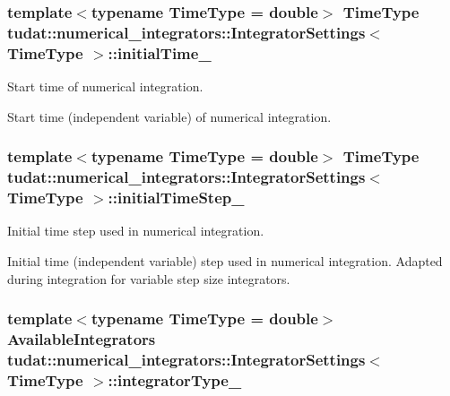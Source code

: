 \subsubsection[{\texorpdfstring{initial\+Time\+\_\+}{initialTime_}}]{\setlength{\rightskip}{0pt plus 5cm}template$<$typename Time\+Type  = double$>$ Time\+Type {\bf tudat\+::numerical\+\_\+integrators\+::\+Integrator\+Settings}$<$ Time\+Type $>$\+::initial\+Time\+\_\+}\hypertarget{classtudat_1_1numerical__integrators_1_1IntegratorSettings_ade260f7c4ac8183e011b7c46f17fdcb4}{}\label{classtudat_1_1numerical__integrators_1_1IntegratorSettings_ade260f7c4ac8183e011b7c46f17fdcb4}


Start time of numerical integration. 

Start time (independent variable) of numerical integration. 
\subsubsection[{\texorpdfstring{initial\+Time\+Step\+\_\+}{initialTimeStep_}}]{\setlength{\rightskip}{0pt plus 5cm}template$<$typename Time\+Type  = double$>$ Time\+Type {\bf tudat\+::numerical\+\_\+integrators\+::\+Integrator\+Settings}$<$ Time\+Type $>$\+::initial\+Time\+Step\+\_\+}\hypertarget{classtudat_1_1numerical__integrators_1_1IntegratorSettings_ad97592b354b94c4e3d74f4e5579c8b14}{}\label{classtudat_1_1numerical__integrators_1_1IntegratorSettings_ad97592b354b94c4e3d74f4e5579c8b14}


Initial time step used in numerical integration. 

Initial time (independent variable) step used in numerical integration. Adapted during integration for variable step size integrators. 
\subsubsection[{\texorpdfstring{integrator\+Type\+\_\+}{integratorType_}}]{\setlength{\rightskip}{0pt plus 5cm}template$<$typename Time\+Type  = double$>$ Available\+Integrators {\bf tudat\+::numerical\+\_\+integrators\+::\+Integrator\+Settings}$<$ Time\+Type $>$\+::integrator\+Type\+\_\+}\hypertarget{classtudat_1_1numerical__integrators_1_1IntegratorSettings_ab1fa0bf04bb06c5fee5a84bef7243ce4}{}\label{classtudat_1_1numerical__integrators_1_1IntegratorSettings_ab1fa0bf04bb06c5fee5a84bef7243ce4}


